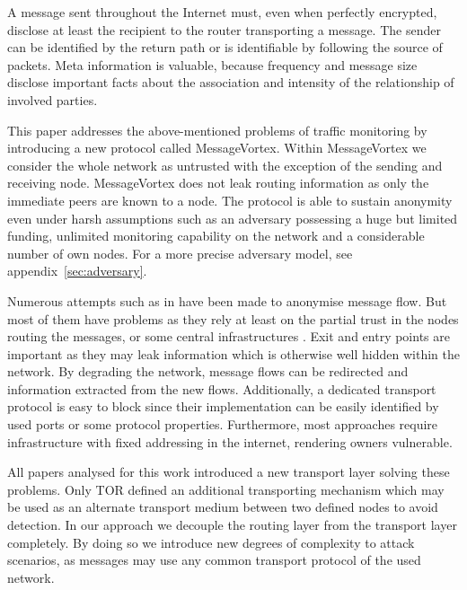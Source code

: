 \documentclass[9pt,journal,compsoc]{IEEEtran}
\begin{document}
A message sent throughout the Internet must, even when perfectly encrypted, disclose at least the recipient to the router transporting a message. The sender can be identified by the return path or is identifiable by following the source of packets. Meta information is valuable, because frequency and message size disclose important facts about the association and intensity of the relationship of involved parties. %

This paper addresses the above-mentioned problems of traffic monitoring by introducing a new  protocol called MessageVortex. Within MessageVortex we consider the whole network as untrusted with the exception of the sending and receiving node. MessageVortex does not leak routing information as only the immediate peers are known to a node. The protocol is able to sustain anonymity\cite{anon_terminology} even under harsh assumptions such as an adversary possessing a huge but limited funding, unlimited monitoring capability on the network and a considerable number of own nodes. For a more precise adversary model, see appendix~\ref{sec:adversary}.

Numerous attempts such as in \cite{minion-design,babel,mixmaster-spec,tor-design,freehaven-berk,herbivore:tr} have been made to anonymise message flow. But most of them have problems as they rely at least on the partial trust in the nodes routing the messages, or some central infrastructures \cite{hs-attack06,esorics13-cellflood,esorics12-torscan,oakland2013-trawling}. Exit and entry points are important as they may leak information which is otherwise well hidden within the network. By degrading the network, message flows can be redirected and information extracted from the new flows. Additionally, a dedicated transport protocol is easy to block since their implementation can be easily identified by used ports or some protocol properties. Furthermore, most approaches require infrastructure with fixed addressing in the internet, rendering owners vulnerable.

All papers analysed for this work introduced a new transport layer solving these problems. Only TOR defined an additional transporting mechanism which may be used as an alternate transport medium between two defined nodes to avoid detection. In our approach we decouple the routing layer from the transport layer completely. By doing so we introduce new degrees of complexity to attack scenarios, as messages may use any common transport protocol of the used network. 
\end{document}
